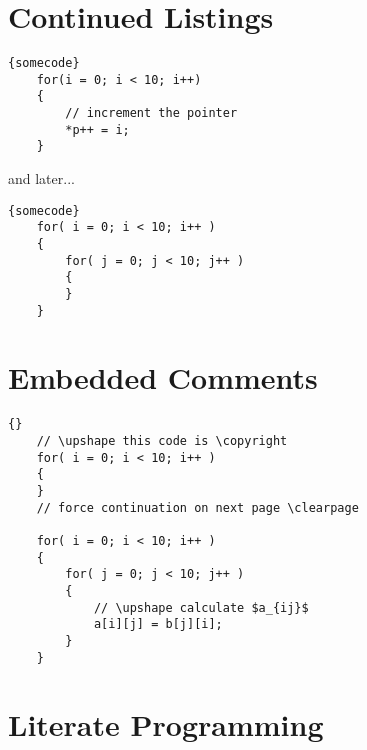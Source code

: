 \documentclass{article}
\begin{document}
\clearpage
\section{Continued Listings}

\lstset{language=c++}
\lstset{commentstyle=\textit}
\lstset{backgroundcolor=,rulecolor=}
\begin{lstlisting}[frame=tb]{somecode}
    for(i = 0; i < 10; i++)
    {
        // increment the pointer
        *p++ = i;
    }
\end{lstlisting}

and later...
\begin{lstlisting}[frame=tb]{somecode}
    for( i = 0; i < 10; i++ )
    {
        for( j = 0; j < 10; j++ )
        {
        }
    }
\end{lstlisting}

\section{Embedded Comments}


\begin{lstlisting}[frame=tb,texcl]{}
    // \upshape this code is \copyright
    for( i = 0; i < 10; i++ )
    {
    }
    // force continuation on next page \clearpage

    for( i = 0; i < 10; i++ )
    {
        for( j = 0; j < 10; j++ )
        {
            // \upshape calculate $a_{ij}$
            a[i][j] = b[j][i];
        }
    }
\end{lstlisting}


\section{Literate Programming}
\end{document}
